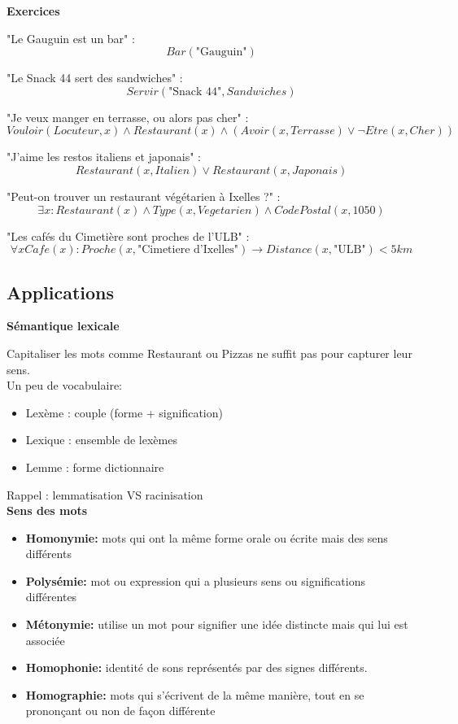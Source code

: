 \textbf{Exercices}

"Le Gauguin est un bar" : $$Bar(\text{"Gauguin"})$$

"Le Snack 44 sert des sandwiches" : $$Servir(\text{"Snack 44"}, Sandwiches)$$

"Je veux manger en terrasse, ou alors pas cher" : $$Vouloir(Locuteur, x) \land Restaurant(x) \land ( Avoir(x, Terrasse) \lor \neg Etre(x, Cher) )$$

"J'aime les restos italiens et japonais" : $$Restaurant(x, Italien) \lor Restaurant(x, Japonais)$$

"Peut-on trouver un restaurant végétarien à Ixelles ?" : $$ \exists x: Restaurant(x) \land Type(x, Vegetarien) \land CodePostal(x, 1050) $$

"Les cafés du Cimetière sont proches de l'ULB" : $$ \forall x Cafe(x) : Proche(x, \text{"Cimetiere d'Ixelles"}) \rightarrow Distance(x, \text{"ULB"}) < 5km $$

\newpage

\subsection{Applications}

\textbf{Sémantique lexicale}

Capitaliser les mots comme Restaurant ou Pizzas ne suffit pas pour capturer leur sens.\\

Un peu de vocabulaire:

\begin{itemize}
    \item Lexème : couple (forme + signification)
    \item Lexique : ensemble de lexèmes
    \item Lemme : forme dictionnaire\\
\end{itemize}

Rappel : lemmatisation VS racinisation\\

\textbf{Sens des mots}

\begin{itemize}
\item \textbf{Homonymie:} mots qui ont la même forme orale ou écrite mais des sens différents
\item \textbf{Polysémie:} mot ou expression qui a plusieurs sens ou significations différentes
\item \textbf{Métonymie:} utilise un mot pour signifier une idée distincte mais qui lui est associée
\item \textbf{Homophonie:} identité de sons représentés par des signes différents.
\item \textbf{Homographie:} mots qui s'écrivent de la même manière, tout en se prononçant ou non de façon différente\\
\end{itemize}

